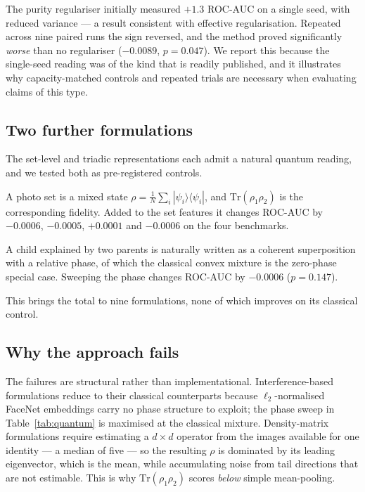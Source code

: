 \documentclass[journal,12pt]{IEEEtran}
\begin{document}
The purity regulariser initially measured $+1.3$ ROC-AUC on a single seed, with
reduced variance --- a result consistent with effective regularisation. Repeated
across nine paired runs the sign reversed, and the method proved significantly
\emph{worse} than no regulariser ($-0.0089$, $p = 0.047$). We report this
because the single-seed reading was of the kind that is readily published, and
it illustrates why capacity-matched controls and repeated trials are necessary
when evaluating claims of this type.

\subsection{Two further formulations}

The set-level and triadic representations each admit a natural quantum reading,
and we tested both as pre-registered controls.

A photo set is a mixed state $\rho = \frac{1}{N}\sum_i
|\psi_i\rangle\langle\psi_i|$, and $\mathrm{Tr}(\rho_1 \rho_2)$ is the
corresponding fidelity. Added to the set features it changes ROC-AUC by
$-0.0006$, $-0.0005$, $+0.0001$ and $-0.0006$ on the four benchmarks.

A child explained by two parents is naturally written as a coherent
superposition with a relative phase, of which the classical convex mixture is
the zero-phase special case. Sweeping the phase changes ROC-AUC by $-0.0006$
($p = 0.147$).

This brings the total to nine formulations, none of which improves on its
classical control.

\subsection{Why the approach fails}

The failures are structural rather than implementational. Interference-based
formulations reduce to their classical counterparts because $\ell_2$-normalised
FaceNet embeddings carry no phase structure to exploit; the phase sweep in
Table~\ref{tab:quantum} is maximised at the classical mixture. Density-matrix
formulations require estimating a $d \times d$ operator from the images
available for one identity --- a median of five --- so the resulting $\rho$ is
dominated by its leading eigenvector, which is the mean, while accumulating
noise from tail directions that are not estimable. This is why
$\mathrm{Tr}(\rho_1\rho_2)$ scores \emph{below} simple mean-pooling.
\end{document}
